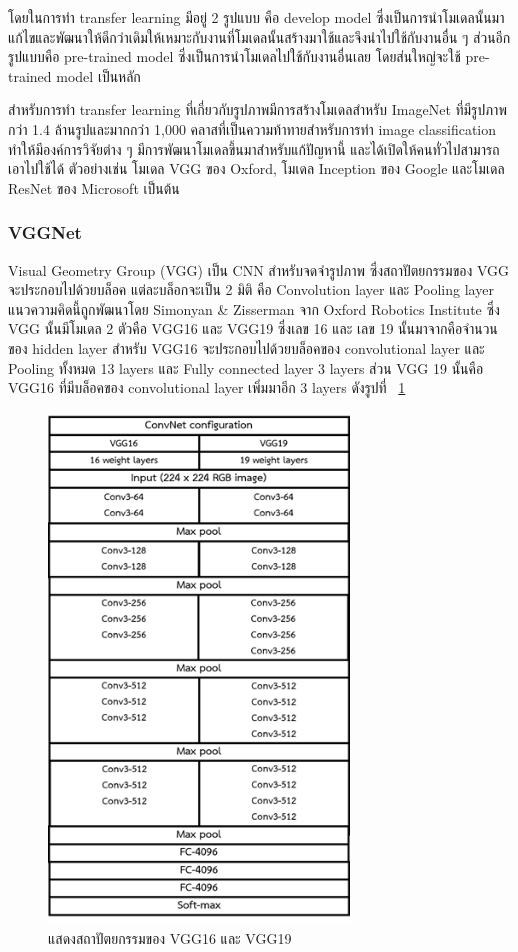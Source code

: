 \documentclass[12pt,oneside,openright,a4paper]{cpe-thai-project}
\begin{document}
\par\setlength{\parindent}{5ex}
โดยในการทำ transfer learning มีอยู่ 2 รูปแบบ คือ develop model ซึ่งเป็นการนำโมเดลนั้นมาแก้ไขและพัฒนาให้ดีกว่าเดิมให้เหมาะกับงานที่โมเดลนั้นสร้างมาใช้และจึงนำไปใช้กับงานอื่น ๆ ส่วนอีกรูปแบบคือ pre-trained model ซึ่งเป็นการนำโมเดลไปใช้กับงานอื่นเลย โดยส่นใหญ่จะใช้ pre-trained model เป็นหลัก 
\par\setlength{\parindent}{5ex}
สำหรับการทำ transfer learning ที่เกี่ยวกับรูปภาพ\cite{8636278}\cite{sarkar2018comprehensive}มีการสร้างโมเดลสำหรับ ImageNet ที่มีรูปภาพกว่า 1.4 ล้านรูปและมากกว่า 1,000 คลาสที่เป็นความท้าทายสำหรับการทำ image classification ทำให้มีองค์การวิจัยต่าง ๆ มีการพัฒนาโมเดลขึ้นมาสำหรับแก้ปัญหานี้ และได้เปิดให้คนทั่วไปสามารถเอาไปใช้ได้ ตัวอย่างเช่น โมเดล VGG ของ Oxford, โมเดล Inception ของ Google และโมเดล ResNet ของ Microsoft เป็นต้น

\subsubsection{VGGNet}
\par\setlength{\parindent}{5ex}
Visual Geometry Group (VGG) เป็น CNN สำหรับจดจำรูปภาพ ซึ่งสถาปัตยกรรมของ VGG จะประกอบไปด้วยบล็อค 
แต่ละบล็อกจะเป็น 2 มิติ คือ Convolution layer และ Pooling layer แนวความคิดนี้ถูกพัฒนาโดย 
Simonyan \& Zisserman จาก Oxford Robotics Institute ซึ่ง VGG นั้นมีโมเดล 2 ตัวคือ VGG16 และ VGG19 
ซึ่งเลข 16 และ เลข 19 นั้นมาจากคือจำนวนของ hidden layer สำหรับ VGG16 จะประกอบไปด้วยบล็อคของ 
convolutional layer และ Pooling ทั้งหมด 13 layers และ Fully connected layer 3 layers ส่วน VGG 19 
นั้นคือ VGG16 ที่มีบล็อคของ convolutional layer เพิ่มมาอีก 3 layers  ดังรูปที่ ~\ref{fig:vgg16-19} 

\begin{figure}[!h]
  \centering
  \includegraphics[width=8cm]{./image/vgg16-19.png}
  \caption{แสดงสถาปัตยกรรมของ VGG16 และ VGG19}
  \label{fig:vgg16-19}
\end{figure}
\end{document}
